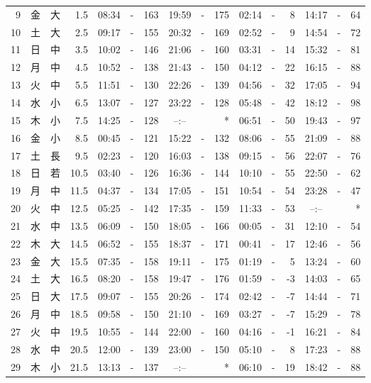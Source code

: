 \documentclass[12pt.a4j]{jsarticle}
\begin{document}
\begin{center}
\begin{table}[ht]
\begin{tabular}{|rc|cr|ccrccr|ccrccr|}
 9 & 金 & 大 &  1.5 & 08:34 &-& 163 & 19:59 &-& 175 & 02:14 &-&   8 & 14:17 &-&  64 \\
10 & 土 & 大 &  2.5 & 09:17 &-& 155 & 20:32 &-& 169 & 02:52 &-&   9 & 14:54 &-&  72 \\
11 & 日 & 中 &  3.5 & 10:02 &-& 146 & 21:06 &-& 160 & 03:31 &-&  14 & 15:32 &-&  81 \\
12 & 月 & 中 &  4.5 & 10:52 &-& 138 & 21:43 &-& 150 & 04:12 &-&  22 & 16:15 &-&  88 \\
13 & 火 & 中 &  5.5 & 11:51 &-& 130 & 22:26 &-& 139 & 04:56 &-&  32 & 17:05 &-&  94 \\
14 & 水 & 小 &  6.5 & 13:07 &-& 127 & 23:22 &-& 128 & 05:48 &-&  42 & 18:12 &-&  98 \\
15 & 木 & 小 &  7.5 & 14:25 &-& 128 & --:-- & &  *  & 06:51 &-&  50 & 19:43 &-&  97 \\
16 & 金 & 小 &  8.5 & 00:45 &-& 121 & 15:22 &-& 132 & 08:06 &-&  55 & 21:09 &-&  88 \\
17 & 土 & 長 &  9.5 & 02:23 &-& 120 & 16:03 &-& 138 & 09:15 &-&  56 & 22:07 &-&  76 \\
18 & 日 & 若 & 10.5 & 03:40 &-& 126 & 16:36 &-& 144 & 10:10 &-&  55 & 22:50 &-&  62 \\
19 & 月 & 中 & 11.5 & 04:37 &-& 134 & 17:05 &-& 151 & 10:54 &-&  54 & 23:28 &-&  47 \\
20 & 火 & 中 & 12.5 & 05:25 &-& 142 & 17:35 &-& 159 & 11:33 &-&  53 & --:-- & &  *  \\
21 & 水 & 中 & 13.5 & 06:09 &-& 150 & 18:05 &-& 166 & 00:05 &-&  31 & 12:10 &-&  54 \\
22 & 木 & 大 & 14.5 & 06:52 &-& 155 & 18:37 &-& 171 & 00:41 &-&  17 & 12:46 &-&  56 \\
23 & 金 & 大 & 15.5 & 07:35 &-& 158 & 19:11 &-& 175 & 01:19 &-&   5 & 13:24 &-&  60 \\
24 & 土 & 大 & 16.5 & 08:20 &-& 158 & 19:47 &-& 176 & 01:59 &-&  -3 & 14:03 &-&  65 \\
25 & 日 & 大 & 17.5 & 09:07 &-& 155 & 20:26 &-& 174 & 02:42 &-&  -7 & 14:44 &-&  71 \\
26 & 月 & 中 & 18.5 & 09:58 &-& 150 & 21:10 &-& 169 & 03:27 &-&  -7 & 15:29 &-&  78 \\
27 & 火 & 中 & 19.5 & 10:55 &-& 144 & 22:00 &-& 160 & 04:16 &-&  -1 & 16:21 &-&  84 \\
28 & 水 & 中 & 20.5 & 12:00 &-& 139 & 23:00 &-& 150 & 05:10 &-&   8 & 17:23 &-&  88 \\
29 & 木 & 小 & 21.5 & 13:13 &-& 137 & --:-- & &  *  & 06:10 &-&  19 & 18:42 &-&  88 \\

\end{tabular}
\end{table}
\end{center}
\end{document}
